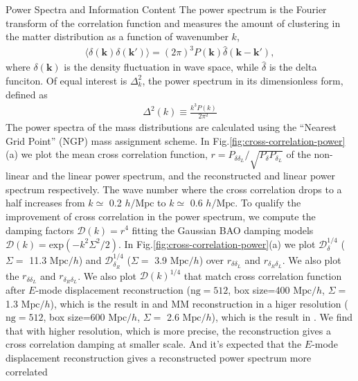 \begin{section}{Power Spectra and Information Content}
  \label{sec:fisherinfo}
    The power spectrum is the Fourier transform of the correlation function and measures
 the amount of clustering in the matter distribution as a function of wavenumber $k$,
\begin{align}
    \langle \delta \left( \bm{k} \right) \delta \left( \bm{k'}\right) \rangle =
\left( 2\pi \right) ^3 P \left( \bm{k} \right) \hat{\delta} \left( \bm{k}-\bm{k'} \right),
\end{align}
where $\delta \left( \bm{k} \right)$ is the density fluctuation in wave space, while 
$\hat{\delta}$ is the delta funciton. Of equal interest is $\Delta ^2_k$, the power 
spectrum in its dimensionless form, defined as
\begin{align}
    \Delta ^2(k) \equiv \frac{k^3 P \left( k \right)}{2\pi ^2}
\end{align}
    The power spectra of the mass distributions are calculated using the \enquote{Nearest Grid Point} 
(NGP) mass assignment scheme. In Fig.\ref{fig:cross-correlation-power}(a) we plot the mean cross correlation 
function, $r=P_{\delta \delta_L}/\sqrt{P_\delta P_{\delta_L}}$ of the non-linear and the 
linear power spectrum, and the reconstructed and 
linear power spectrum respectively. The wave number where the cross correlation drops to a half increases 
from $k\simeq$ 0.2 $h/\mathrm{Mpc}$ to $k \simeq$ 0.6 $h/\mathrm{Mpc}$. 
To qualify the improvement of cross correlation in the 
power spectrum, we compute the damping factors $\mathcal{D}(k)=r^4$ fitting the Gaussian BAO damping models 
$\mathcal{D}(k)=\mathrm{exp}(-k^2 \Sigma^2/2)$. In Fig.\ref{fig:cross-correlation-power}(a) 
we plot $\mathcal{D}_\delta^{1/4}$ ($\Sigma =$ 11.3 $\mathrm{Mpc}/h$) and $\mathcal{D}_{\delta_R}^{1/4}$ 
($\Sigma = $ 3.9 $\mathrm{Mpc}/h$) over $r_{\delta\delta_L}$ and $r_{\delta_R\delta_L}$. 
We also plot the $r_{\delta\delta_L}$ and $r_{\delta_R\delta_L}$. We also plot $\mathcal{D}(k)^{1/4}$ 
that match cross correlation function after $E$-mode displacement 
reconstruction ($\mathrm{ng}=512$, box size=400 $\mathrm{Mpc}/h$, $\Sigma =$ 1.3 $\mathrm{Mpc}/h$), 
which is the result in \cite{bib:Yu2016} and 
MM reconstruction in a higer resolution ($\mathrm{ng}=512$, box size=600 $\mathrm{Mpc}/h$, $\Sigma =$ 2.6 $\mathrm{Mpc}/h$), 
which is the result in \cite{bib:ZhuH2016}. We find that with higher resolution, which is more precise, 
the reconstruction gives a cross correlation damping at smaller scale. 
And it's expected that the $E$-mode displacement reconstruction gives a reconstructed power spectrum more correlated 

\end{section}
